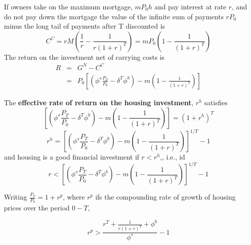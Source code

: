 If  owners take on the maximum mortgage, $mP_0h$ and pay interest at rate $r$, %
and do not pay down the mortgage the value of the infinite sum of payments $ rP_0$  minus the long tail of payments after T discounted is 
\[C^C= rM\left(\frac{1}{r} - \frac{1}{r(1+r)^T}\right)= mP_0\left(1- \frac{1}{(1+r)^T}\right) \]%
The return on the investment net of carrying costs is 
\begin{eqnarray}
R&=&G^N-C^C \\
&=&P_0\left[ \left(\phi^s \frac{P_T}{P_0}-\delta^T\phi^b\right)      -m\left(1- \frac{1}{(1+r)^T}\right) \right]
\end{eqnarray}


The \textbf{effective rate of  return on the housing investment}, $r^h$ satisfies 
\[\left[ \left(\phi^s \frac{P_T}{P_0}-\delta^T\phi^b\right)      -m\left(1- \frac{1}{(1+r)^T}\right) \right]=(1+r^h)^T\]
\[r^h=\left[ \left(\phi^s \frac{P_T}{P_0}-\delta^T\phi^b\right)      -m\left(1- \frac{1}{(1+r)^T}\right) \right]^{1/T}-1\]
and housing is a good financial investment if $r<r^h$,, i.e., id
\[r< \left[ \left(\phi^s \frac{P_T}{P_0}-\delta^T\phi^b\right)      -m\left(1- \frac{1}{(1+r)^T}\right) \right]^{1/T}-1\]

Writing $\frac{P_T}{P_0}= 1+r^p$, where $r^p$ ifs the compounding rate of growth of housing prices over the period $0-T$,  

\[r^p>\frac{r^T+ \frac{1}{r(1+r)^T}+\phi^b}{\phi^s}-1\]
